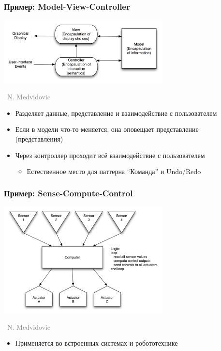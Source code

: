 \documentclass[xetex,mathserif,serif]{beamer}
\newcommand{\attribution}[1] {
	\vspace{-5mm}\begin{flushright}\begin{scriptsize}\textcolor{gray}{\textcopyright\, #1}\end{scriptsize}\end{flushright}
}
\begin{document}
	\begin{frame}
		\frametitle{Пример: Model-View-Controller}
		\begin{center}
			\includegraphics[width=0.65\textwidth]{mvc.png}
			\attribution{N. Medvidovic}
		\end{center}
		\begin{itemize}
			\item Разделяет данные, представление и взаимодействие с пользователем
			\item Если в модели что-то меняется, она оповещает представление (представления)
			\item Через контроллер проходит всё взаимодействие с пользователем
			\begin{itemize}
				\item Естественное место для паттерна ``Команда'' и Undo/Redo
			\end{itemize}
		\end{itemize}
	\end{frame}

	\begin{frame}
		\frametitle{Пример: Sense-Compute-Control}
		\begin{center}
			\includegraphics[width=0.65\textwidth]{senseComputeControl.png}
			\attribution{N. Medvidovic}
		\end{center}
		\begin{itemize}
			\item Применяется во встроенных системах и робототехнике
		\end{itemize}
	\end{frame}
\end{document}
